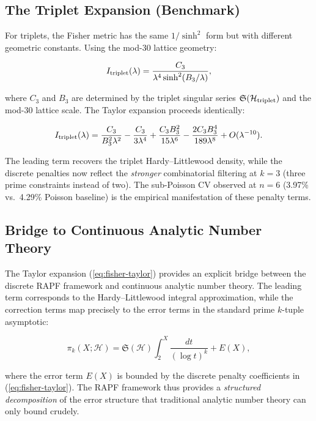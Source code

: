 \documentclass[11pt]{article}
\theoremstyle{remark}
\begin{document}
\subsection{The Triplet Expansion (Benchmark)}

For triplets, the Fisher metric has the same $1/\sinh^2$ form but with
different geometric constants. Using the mod-30 lattice geometry:

\begin{equation}
I_{\rm triplet}(\lambda) = \frac{C_3}{\lambda^4 \sinh^2(B_3/\lambda)},
\end{equation}

where $C_3$ and $B_3$ are determined by the triplet singular series
$\mathfrak{S}(\mathcal{H}_{\rm triplet})$ and the mod-30 lattice
scale. The Taylor expansion proceeds identically:

\begin{equation}
I_{\rm triplet}(\lambda) = \frac{C_3}{B_3^2 \lambda^2}
- \frac{C_3}{3\lambda^4} + \frac{C_3 B_3^2}{15\lambda^6}
- \frac{2C_3 B_3^4}{189\lambda^8} + O(\lambda^{-10}).
\end{equation}

The leading term recovers the triplet Hardy--Littlewood density, while
the discrete penalties now reflect the \emph{stronger} combinatorial
filtering at $k=3$ (three prime constraints instead of two). The
sub-Poisson CV observed at $n=6$ (3.97\% vs.\ 4.29\% Poisson baseline)
is the empirical manifestation of these penalty terms.

\subsection{Bridge to Continuous Analytic Number Theory}

The Taylor expansion (\ref{eq:fisher-taylor}) provides an explicit bridge
between the discrete RAPF framework and continuous analytic number
theory. The leading term corresponds to the Hardy--Littlewood integral
approximation, while the correction terms map precisely to the error
terms in the standard prime $k$-tuple asymptotic:

\begin{equation}
\pi_k(X; \mathcal{H}) = \mathfrak{S}(\mathcal{H}) \int_2^X
\frac{dt}{(\log t)^k} + E(X),
\end{equation}

where the error term $E(X)$ is bounded by the discrete penalty
coefficients in (\ref{eq:fisher-taylor}). The RAPF framework thus
provides a \emph{structured decomposition} of the error structure that
traditional analytic number theory can only bound crudely.
\end{document}
